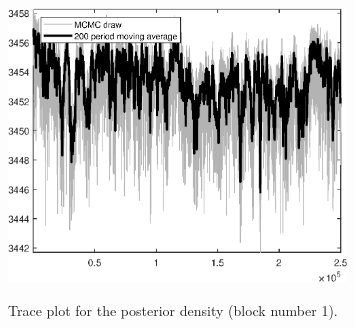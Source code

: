 \begin{figure}[H]
\centering
  \includegraphics[width=0.8\textwidth]{BRS_growth_ext_util/graphs/TracePlot_Posterior_blck_1}\\
    \caption{Trace plot for the posterior density (block number 1).}
\end{figure}
